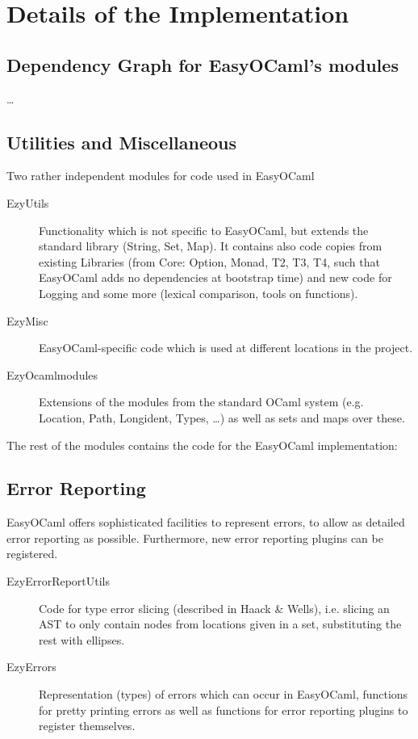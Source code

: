 
\section{Details of the Implementation}

\label{impldets}

\subsection{Dependency Graph for EasyOCaml's modules}

\ldots

\subsection{Utilities and Miscellaneous}

Two rather independent modules for code used in EasyOCaml

\begin{description}
    \item[EzyUtils] Functionality which is not specific to 
        EasyOCaml, but extends the standard library (String, Set, Map). 
        It contains also code copies from existing Libraries (from Core: 
        Option, Monad, T2, T3, T4, such that EasyOCaml adds no 
        dependencies at bootstrap time) and new code for Logging and 
        some more (lexical comparison, tools on functions).
    \item[EzyMisc] EasyOCaml-specific code which is used at 
        different locations in the project.
    \item[EzyOcamlmodules] Extensions of the modules from the 
        standard OCaml system (e.g. Location, Path, Longident, Types, 
        \ldots{}) as well as sets and maps over these.
\end{description}

The rest of the modules contains the code for the EasyOCaml 
implementation:


\subsection{Error Reporting}
\label{hd005003}
EasyOCaml offers sophisticated facilities to represent errors, to allow 
as detailed error reporting as possible.  Furthermore, new error 
reporting plugins can be registered.

\begin{description}
    \item[EzyErrorReportUtils] Code for type error slicing 
        (described in Haack \& Wells), i.e. slicing an AST to only 
        contain nodes from locations given in a set, substituting the 
        rest with ellipses.
    \item[EzyErrors] Representation (types) of errors which can 
        occur in EasyOCaml, functions for pretty printing errors as well 
        as functions for error reporting plugins to register themselves.
\end{description}


